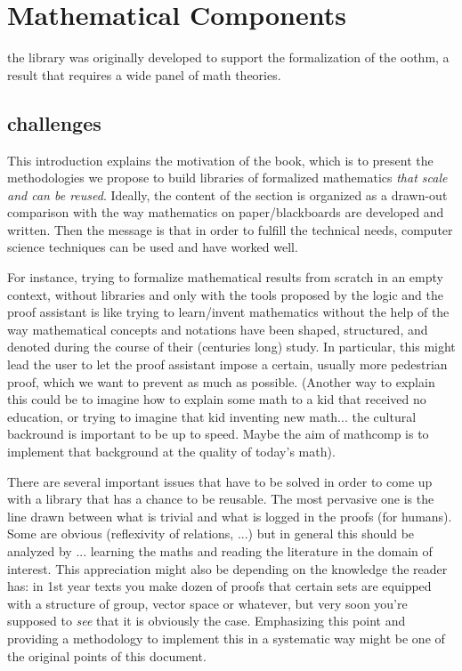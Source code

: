 \setcounter{chapter}{-1}
\chapter{Mathematical Components}

the library was originally developed to support the formalization
of the oothm, a result that requires a wide panel of math theories.

\section{challenges}



This introduction explains the motivation of the book, which is to
present the methodologies we propose to build libraries of formalized
mathematics \emph{that scale and can be reused}. Ideally, the content
of the section is organized as a drawn-out comparison with the way
mathematics on paper/blackboards are developed and written. Then the
message is that in order to fulfill the technical needs, computer
science techniques can be used and have worked well.

For instance, trying to formalize mathematical results from scratch in
an empty context, without libraries and only with the tools proposed
by the logic and the proof assistant is like trying to learn/invent
mathematics without the help of the way mathematical concepts and
notations have been shaped, structured, and denoted during the course
of their (centuries long) study.
In particular, this might lead the user to let the
proof assistant impose a certain, usually more pedestrian proof, which
we want to prevent as much as possible.
(Another way to explain this could be to imagine how to explain some math
to a kid that received no education, or trying to imagine that kid
inventing new math... the cultural backround is important to be up to
speed. Maybe the aim of mathcomp is to implement that background at the
quality of today's math).

There are several important issues that have to be solved in order to
come up with a library that has a chance to be reusable. The most
pervasive one is the line drawn between what is trivial and what is
logged in the proofs (for humans). Some are obvious (reflexivity of
relations, ...) but in general this should be analyzed by
... learning the maths and reading the literature in the domain of
interest. This appreciation might also be depending on the knowledge
the reader has: in 1st year texts you make dozen of proofs that
certain sets are equipped with a structure of group, vector space or
whatever, but very soon you're supposed to \emph{see} that it is
obviously the case. Emphasizing this point and providing a methodology to
implement this in a systematic way might be one of the original points
of this document. 

